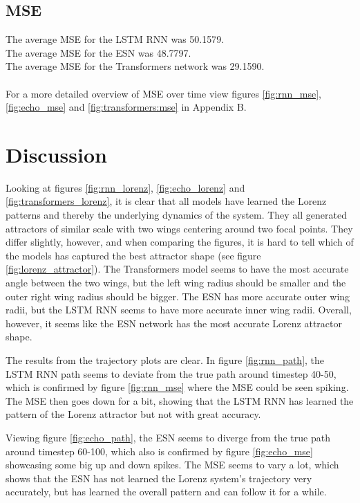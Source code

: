 \documentclass[11pt]{article}
\begin{document}
\subsection{MSE}
The average MSE for the LSTM RNN was 50.1579. \\
The average MSE for the ESN was 48.7797. \\
The average MSE for the Transformers network was 29.1590. \\ \\
For a more detailed overview of MSE over time view figures \ref{fig:rnn_mse}, \ref{fig:echo_mse} and \ref{fig:transformers:mse} in Appendix B.

\section{Discussion}
Looking at figures \ref{fig:rnn_lorenz}, \ref{fig:echo_lorenz} and \ref{fig:transformers_lorenz}, it is clear that all models have learned the Lorenz patterns and thereby the underlying dynamics of the system. They all generated attractors of similar scale with two wings centering around two focal points. They differ slightly, however, and when comparing the figures, it is hard to tell which of the models has captured the best attractor shape (see figure \ref{fig:lorenz_attractor}). The Transformers model seems to have the most accurate angle between the two wings, but the left wing radius should be smaller and the outer right wing radius should be bigger. The ESN has more accurate outer wing radii, but the LSTM RNN seems to have more accurate inner wing radii. Overall, however, it seems like the ESN network has the most accurate Lorenz attractor shape.


The results from the trajectory plots are clear. In figure \ref{fig:rnn_path}, the LSTM RNN path seems to deviate from the true path around timestep 40-50, which is confirmed by figure \ref{fig:rnn_mse} where the MSE could be seen spiking. The MSE then goes down for a bit, showing that the LSTM RNN has learned the pattern of the Lorenz attractor but not with great accuracy.

Viewing figure \ref{fig:echo_path}, the ESN seems to diverge from the true path around timestep 60-100, which also is confirmed by figure \ref{fig:echo_mse} showcasing some big up and down spikes. The MSE seems to vary a lot, which shows that the ESN has not learned the Lorenz system's trajectory very accurately, but has learned the overall pattern and can follow it for a while.
\end{document}

